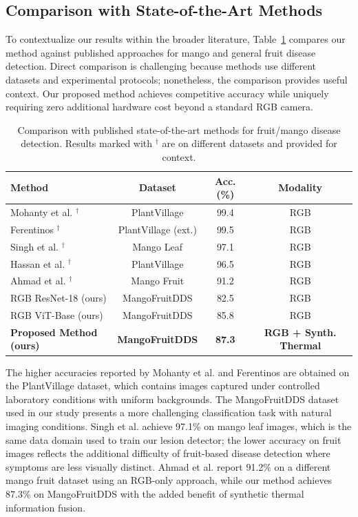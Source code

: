 \documentclass[utf8]{FrontiersinHarvard} %
\begin{document}
\subsection{Comparison with State-of-the-Art Methods}
To contextualize our results within the broader literature, Table~\ref{tab:sota} compares our method against published approaches for mango and general fruit disease detection. Direct comparison is challenging because methods use different datasets and experimental protocols; nonetheless, the comparison provides useful context. Our proposed method achieves competitive accuracy while uniquely requiring zero additional hardware cost beyond a standard RGB camera.

\begin{table}[h!]
    \caption{Comparison with published state-of-the-art methods for fruit/mango disease detection. Results marked with $^{\dagger}$ are on different datasets and provided for context.}
    \label{tab:sota}
    \raggedright
    \scriptsize
    \begin{tabular}{lccc}
        \toprule
        \textbf{Method} & \textbf{Dataset} & \textbf{Acc. (\%)} & \textbf{Modality} \\
        \midrule
        Mohanty et al. \cite{mohanty2016}$^{\dagger}$ & PlantVillage & 99.4 & RGB \\
        Ferentinos \cite{ferentinos2018}$^{\dagger}$ & PlantVillage (ext.) & 99.5 & RGB \\
        Singh et al. \cite{singh2019}$^{\dagger}$ & Mango Leaf & 97.1 & RGB \\
        Hassan et al. \cite{hassan2021}$^{\dagger}$ & PlantVillage & 96.5 & RGB \\
        Ahmad et al. \cite{ahmad2023}$^{\dagger}$ & Mango Fruit & 91.2 & RGB \\
        \midrule
        RGB ResNet-18 (ours) & MangoFruitDDS & 82.5 & RGB \\
        RGB ViT-Base (ours) & MangoFruitDDS & 85.8 & RGB \\
        \textbf{Proposed Method (ours)} & \textbf{MangoFruitDDS} & \textbf{87.3} & \textbf{RGB + Synth. Thermal} \\
        \bottomrule
    \end{tabular}
\end{table}

The higher accuracies reported by Mohanty et al. \cite{mohanty2016} and Ferentinos \cite{ferentinos2018} are obtained on the PlantVillage dataset, which contains images captured under controlled laboratory conditions with uniform backgrounds. The MangoFruitDDS dataset used in our study presents a more challenging classification task with natural imaging conditions. Singh et al. \cite{singh2019} achieve 97.1\% on mango leaf images, which is the same data domain used to train our lesion detector; the lower accuracy on fruit images reflects the additional difficulty of fruit-based disease detection where symptoms are less visually distinct. Ahmad et al. \cite{ahmad2023} report 91.2\% on a different mango fruit dataset using an RGB-only approach, while our method achieves 87.3\% on MangoFruitDDS with the added benefit of synthetic thermal information fusion.
\end{document}
